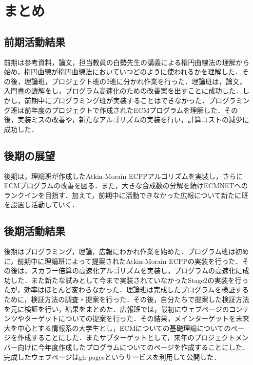 \documentclass[openany,11pt,papersize]{jsbook}
\begin{document}
\chapter{まとめ}

\section{前期活動結果}
前期は参考資料，論文，担当教員の白勢先生の講義による楕円曲線法の理解から始め，楕円曲線が楕円曲線法においていつどのように使われるかを理解した．その後，理論班，プロジェクト班の2班に分かれ作業を行った．理論班は，論文，入門書の読解をし，プログラム高速化のための改善案を出すことに成功した．しかし，前期中にプログラミング班が実装することはできなかった．プログラミング班は前年度のプロジェクトで作成されたECMプログラムを理解した．その後，実装ミスの改善や，新たなアルゴリズムの実装を行い，計算コストの減少に成功した．


\section{後期の展望}

後期は，理論班が作成したAtkin-Morain ECPPアルゴリズムを実装し，さらにECMプログラムの改善を図る．また，大きな合成数の分解を続けECMNETへのランクインを目指す．加えて，前期中に活動できなかった広報について新たに班を設置し活動していく．


\section{後期活動結果}
後期はプログラミング，理論，広報にわかれ作業を始めた．プログラム班は初めに，前期中に理論班によって提案されたAtkin-Morain ECPPの実装を行った．その後は，スカラー倍算の高速化アルゴリズムを実装し，プログラムの高速化に成功した．また新たな試みとして今まで実装されていなかったStage2の実装を行ったが，効率はほとんど変わらなかった．理論班は完成したプログラムを検証するために，検証方法の調査・提案を行った．その後，自分たちで提案した検証方法を元に検証を行い，結果をまとめた．広報班では，最初にウェブページのコンテンツやターゲットについての提案を行った．その結果，メインターゲットを未来大を中心とする情報系の大学生とし，ECMについての基礎理論についてのページを作成することにした．またサブターゲットとして，来年のプロジェクトメンバー向けに今年度作成したプログラムについてのページを作成することにした．完成したウェブページはgh-pagesというサービスを利用して公開した．
\end{document}
